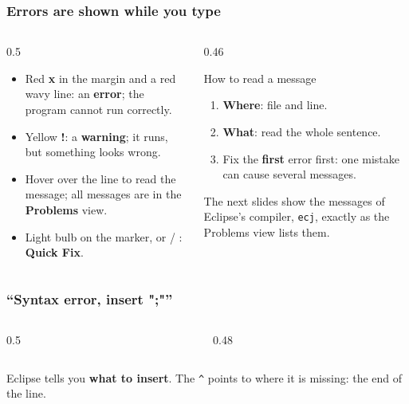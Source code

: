 \documentclass[aspectratio=169,10pt,compress]{beamer}
\begin{document}
\begin{frame}[t,fragile] \frametitle{Errors are shown while you type}
  \begin{columns}[T]
    \begin{column}{0.5\textwidth}
      \begin{itemize}\small
        \item Red \textbf{x} in the margin and a red wavy line: an \textbf{error}; the program cannot run correctly.
        \item Yellow \textbf{!}: a \textbf{warning}; it runs, but something looks wrong.
        \item Hover over the line to read the message; all messages are in the \textbf{Problems} view.
        \item Light bulb on the marker, or  / : \textbf{Quick Fix}.
      \end{itemize}
    \end{column}
    \begin{column}{0.46\textwidth}
      \begin{block}{How to read a message}
        \small
        \begin{enumerate}
          \item \textbf{Where}: file and line.
          \item \textbf{What}: read the whole sentence.
          \item Fix the \textbf{first} error first: one mistake can cause several messages.
        \end{enumerate}
      \end{block}
      \small The next slides show the messages of Eclipse's compiler, \texttt{ecj}, exactly as the Problems view lists them.
    \end{column}
  \end{columns}
\end{frame}




\begin{frame}[t,fragile] \frametitle{``Syntax error, insert ";"''}
  \begin{columns}[T]
    \begin{column}{0.5\textwidth}
    \end{column}
    \begin{column}{0.48\textwidth}
    \end{column}
  \end{columns}

  \vspace{0.2em}
  \small Eclipse tells you \textbf{what to insert}. The \texttt{\textasciicircum} points to where it is missing: the end of the line.
\end{frame}
\end{document}
